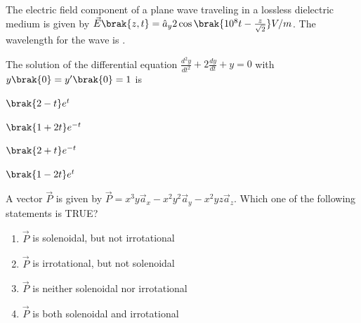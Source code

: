    \hfill{}

    \item The electric field component of a plane wave traveling in a lossless dielectric medium is given by $\vec{E}\brak{z,t}=\hat{a}_{y}2 \cos\brak{10^{8}t-\frac{z}{\sqrt{2}}}V/m$. The wavelength  for the wave is \underline{\hspace{2cm}}.
    
    \hfill{}

    \item The solution of the differential equation $\frac{d^{2}y}{dt^{2}}+2\frac{dy}{dt}+y=0$ with $y\brak{0}=y'\brak{0}=1$ is
    \begin{enumerate}
        \begin{multicols}{2}
            \item $\brak{2-t}e^{t}$
            \item $\brak{1+2t}e^{-t}$
            \item $\brak{2+t}e^{-t}$
            \item $\brak{1-2t}e^{t}$
        \end{multicols}
    \end{enumerate}
    
    \hfill{}

    \item A vector $\vec{P}$ is given by $\vec{P}=x^{3}y\vec{a}_{x}-x^{2}y^{2}\vec{a}_{y}-x^{2}yz\vec{a}_{z}$. Which one of the following statements is TRUE?
    \begin{enumerate}
        \item $\vec{P}$ is solenoidal, but not irrotational
        \item $\vec{P}$ is irrotational, but not solenoidal
        \item $\vec{P}$ is neither solenoidal nor irrotational
        \item $\vec{P}$ is both solenoidal and irrotational
    \end{enumerate}
    
    \hfill{}

